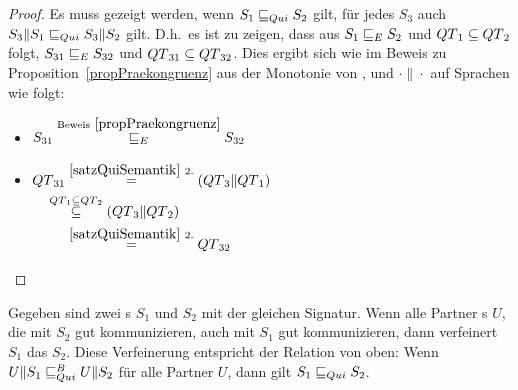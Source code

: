 \begin{proof}
  Es muss gezeigt werden, wenn $S_1\sqsubseteq _{Qui} S_2$ gilt, für jedes $S_3$ auch
  $S_3\|S_1\sqsubseteq _{Qui} S_3\|S_2$ gilt. D.h.\ es ist zu zeigen, dass aus $S_1\sqsubseteq _E
  S_2$ und $QT{}_1\subseteq QT{}_2$ folgt, $S_{31}\sqsubseteq _E S_{32}$ und
  $QT{}_{31}\subseteq QT{}_{32}$. Dies ergibt sich wie im Beweis zu
  Proposition~\ref{propPraekongruenz} aus der Monotonie von \cont{}, \prune{}
  und $\cdot\|\cdot$ auf Sprachen wie folgt:
  \begin{itemize}
    \item $\begin{aligned}[t]
        S_{31} \overset{\mathrm{Beweis}~\ref{propPraekongruenz}}{\sqsubseteq _E} S_{32}
    \end{aligned}$
    \item $\begin{aligned}[t]
        \QT{}_{31} &\overset{\ref{satzQuiSemantik}~2.}{=} (\QT{}_3\|\QT{}_1)\\
        &\hspace{-0.5cm}\overset{\QT{}_1\subseteq \QT{}_2}{\subseteq}
        (\QT{}_3\|\QT{}_2)\\
        &\overset{\ref{satzQuiSemantik}~2.}{=} \QT{}_{32}
    \end{aligned}$
  \end{itemize}
\end{proof}

\begin{lem}
  \label{lemQuiVerfeinerung}
  Gegeben sind zwei \EIO{}s $S_1$ und $S_2$ mit der gleichen Signatur. Wenn
  alle Partner \EIO{}s $U$, die mit $S_2$  gut kommunizieren, auch mit $S_1$
  gut kommunizieren, dann verfeinert $S_1$ das \EIO{} $S_2$. Diese Verfeinerung
  entspricht der Relation \QRel{} von oben: Wenn $U\|S_1\sqsubseteq _{Qui}^B U\|S_2$ für alle
  Partner $U$, dann gilt $S_1\sqsubseteq _{Qui} S_2$.
\end{lem}


